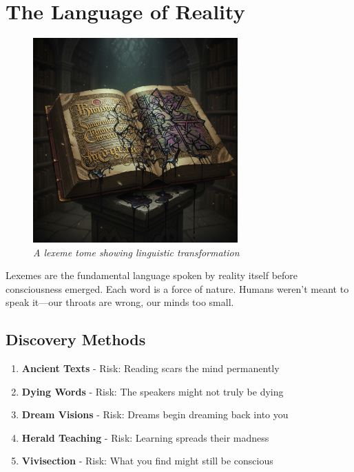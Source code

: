 \documentclass[11pt,a4paper,twoside]{book}
\begin{document}
\section{The Language of Reality}

\begin{figure}[h]
\centering
\includegraphics[width=0.7\textwidth]{images/lexeme_tome_2025-09-03T22-22-18-359Z_1.png}
\caption*{\textit{A lexeme tome showing linguistic transformation}}
\end{figure}

Lexemes are the fundamental language spoken by reality itself before consciousness emerged. Each word is a force of nature. Humans weren't meant to speak it—our throats are wrong, our minds too small.

\subsection{Discovery Methods}

\begin{tcolorbox}[codexbox={Acquiring Lexemes}]
\begin{enumerate}
    \item \textbf{Ancient Texts} - Risk: Reading scars the mind permanently
    \item \textbf{Dying Words} - Risk: The speakers might not truly be dying
    \item \textbf{Dream Visions} - Risk: Dreams begin dreaming back into you
    \item \textbf{Herald Teaching} - Risk: Learning spreads their madness
    \item \textbf{Vivisection} - Risk: What you find might still be conscious
\end{enumerate}
\end{tcolorbox}
\end{document}
